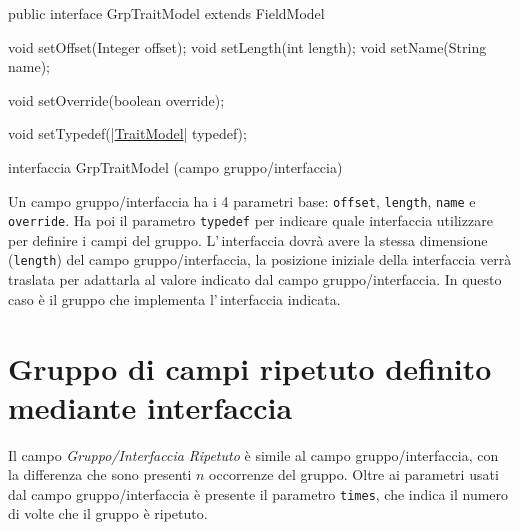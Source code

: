 \documentclass[a4paper,10pt]{report}
\newif\ifesource
\newenvironment{elisting}[1][H]
  {\captionsetup{aboveskip=0pt}\begin{listing}[#1]}
  {\end{listing}%
}
\begin{document}
\ifesource
\begin{figure*}[!htb]
\begin{lstlisting}[language=java, 
caption=interfaccia GrpTraitModel (campo gruppo/interfaccia), 
label=lst:GrpTraitModel]
public interface GrpTraitModel extends FieldModel {
    void setOffset(Integer offset);
    void setLength(int length);
    void setName(String name);
    
    void setOverride(boolean override);
    
    void setTypedef((*\hyperref[lst:TraitModel]{TraitModel}*) typedef);
}
\end{lstlisting}\index{GrpTraitModel}
\end{figure*}
\else
\begin{elisting}[!htb]
\begin{javacode}
public interface GrpTraitModel extends FieldModel {
    void setOffset(Integer offset);
    void setLength(int length);
    void setName(String name);
    
    void setOverride(boolean override);
    
    void setTypedef(|\hyperref[lst:TraitModel]{TraitModel}| typedef);
}
\end{javacode}
\caption{interfaccia GrpTraitModel (campo gruppo/interfaccia)}
\label{lst:GrpTraitModel}
\end{elisting}
\fi

Un campo gruppo/interfaccia ha i 4 parametri base: \verb!offset!, \verb!length!, 
\verb!name! e \verb!override!.
Ha poi il parametro \verb!typedef! per indicare quale interfaccia utilizzare per
definire i campi del gruppo. L'\,interfaccia dovrà avere la stessa dimensione 
(\verb!length!) del campo gruppo/interfaccia, la posizione iniziale della 
interfaccia verrà traslata per adattarla al valore indicato dal campo 
gruppo/interfaccia.
In questo caso è il gruppo che implementa l'\,interfaccia indicata.


\section{Gruppo di campi ripetuto definito mediante interfaccia}
Il campo \textsl{Gruppo/Interfaccia Ripetuto} è simile al campo 
gruppo/interfaccia, con la differenza che sono presenti $n$ occorrenze del 
gruppo. Oltre ai parametri usati dal campo gruppo/interfaccia è presente il 
parametro \verb!times!, che indica il numero di volte che il gruppo è ripetuto.
\end{document}
